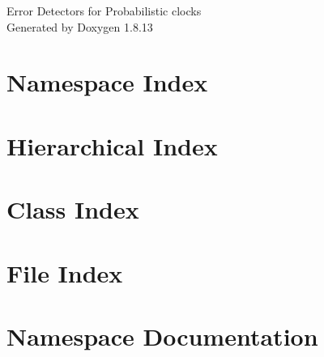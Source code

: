 \documentclass[twoside]{book}
\newcommand{\+}{\discretionary{\mbox{\scriptsize$\hookleftarrow$}}{}{}}
\newcommand{\clearemptydoublepage}{%
  \newpage{\pagestyle{empty}\cleardoublepage}%
}
\begin{document}
\hypersetup{pageanchor=false,
             bookmarksnumbered=true,
             pdfencoding=unicode
            }
\begin{titlepage}
\vspace*{7cm}
\begin{center}%
{\Large Error Detectors for Probabilistic clocks }\\
\vspace*{1cm}
{\large Generated by Doxygen 1.8.13}\\
\end{center}
\end{titlepage}
\clearemptydoublepage
{}
\tableofcontents
\clearemptydoublepage
{}
\hypersetup{pageanchor=true}

\chapter{Namespace Index}

\chapter{Hierarchical Index}

\chapter{Class Index}

\chapter{File Index}

\chapter{Namespace Documentation}

\end{document}
